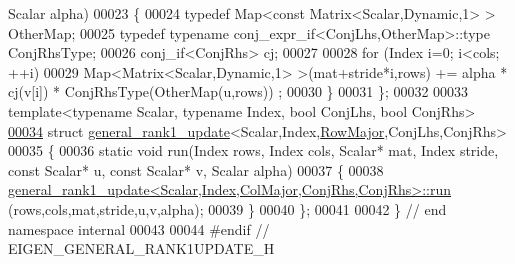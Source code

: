 \begin{DoxyCode}
      Scalar alpha)
00023   \{
00024     \textcolor{keyword}{typedef} Map<const Matrix<Scalar,Dynamic,1> > OtherMap;
00025     \textcolor{keyword}{typedef} \textcolor{keyword}{typename} conj\_expr\_if<ConjLhs,OtherMap>::type ConjRhsType;
00026     conj\_if<ConjRhs> cj;
00027 
00028     \textcolor{keywordflow}{for} (Index i=0; i<cols; ++i)
00029       Map<Matrix<Scalar,Dynamic,1> >(mat+stride*i,rows) += alpha * cj(v[i]) * ConjRhsType(OtherMap(u,rows))
      ;
00030   \}
00031 \};
00032 
00033 \textcolor{keyword}{template}<\textcolor{keyword}{typename} Scalar, \textcolor{keyword}{typename} Index, \textcolor{keywordtype}{bool} ConjLhs, \textcolor{keywordtype}{bool} ConjRhs>
\hyperlink{structinternal_1_1general__rank1__update_3_01_scalar_00_01_index_00_01_row_major_00_01_conj_lhs_00_01_conj_rhs_01_4}{00034} \textcolor{keyword}{struct }\hyperlink{structinternal_1_1general__rank1__update}{general\_rank1\_update}<Scalar,Index,\hyperlink{group__enums_ggaacded1a18ae58b0f554751f6cdf9eb13acfcde9cd8677c5f7caf6bd603666aae3}{RowMajor},ConjLhs,ConjRhs>
00035 \{
00036   \textcolor{keyword}{static} \textcolor{keywordtype}{void} run(Index rows, Index cols, Scalar* mat, Index stride, \textcolor{keyword}{const} Scalar* u, \textcolor{keyword}{const} Scalar* v, 
      Scalar alpha)
00037   \{
00038     \hyperlink{structinternal_1_1general__rank1__update}{general\_rank1\_update<Scalar,Index,ColMajor,ConjRhs,ConjRhs>::run}
      (rows,cols,mat,stride,u,v,alpha);
00039   \}
00040 \};
00041 
00042 \} \textcolor{comment}{// end namespace internal}
00043 
00044 \textcolor{preprocessor}{#endif // EIGEN\_GENERAL\_RANK1UPDATE\_H}
\end{DoxyCode}
